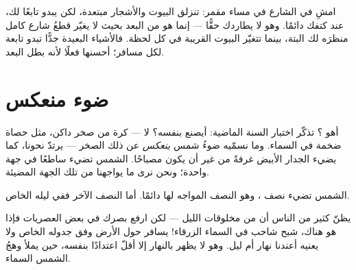 \begin{example}\label{ex:g2:moon-in-the-sky:follows}
امشِ في الشارع في مساء مقمر: تنزلق البيوت والأشجار مبتعدة، لكن
 يبدو تابعًا لك، عند كتفك دائمًا. وهو لا يطاردك حقًّا ---
إنما هو من البعد بحيث لا يغيّر قطعُ شارع كامل منظرَه لك البتة،
بينما تتغيّر البيوت القريبة في كل لحظة. فالأشياء البعيدة جدًّا
تبدو تابعة لكل مسافر؛  أحسنها فعلًا لأنه بطل البعد.
\end{example}

\section{ضوء منعكس}

\begin{example}\label{ex:g2:moon-in-the-sky:borrowed}
أهو ؟ تذكّر اختبار السنة الماضية: أيصنع  بنفسه؟ لا
---  كرة من صخر داكن، مثل حصاة ضخمة في السماء. وما نسمّيه
  ضوءُ شمس \emph{ينعكس} عن ذلك الصخر --- يرتدّ نحونا،
كما يضيء الجدار الأبيض
غرفةً من غير أن يكون مصباحًا. الشمس تضيء  ساطعًا في جهة
واحدة؛ ونحن نرى ما يواجهنا من تلك الجهة المضيئة.
\end{example}

\begin{omfigure}

{\small الشمس تضيء نصف ، وهو النصف المواجه لها دائمًا. أما
النصف الآخر ففي ليله الخاص.}
\end{omfigure}

\begin{remark}\label{rem:g2:moon-in-the-sky:daytime}
يظنّ كثير من الناس أن  من مخلوقات الليل --- لكن ارفع بصرك في
بعض العصريات فإذا هو هناك، شبح شاحب في السماء الزرقاء! 
يسافر حول الأرض وفق جدوله الخاص ولا يعنيه أعندنا نهار أم ليل. وهو
لا يظهر بالنهار إلا أقلّ اعتدادًا بنفسه، حين يملأ وهجُ الشمس
السماء.
\end{remark}

